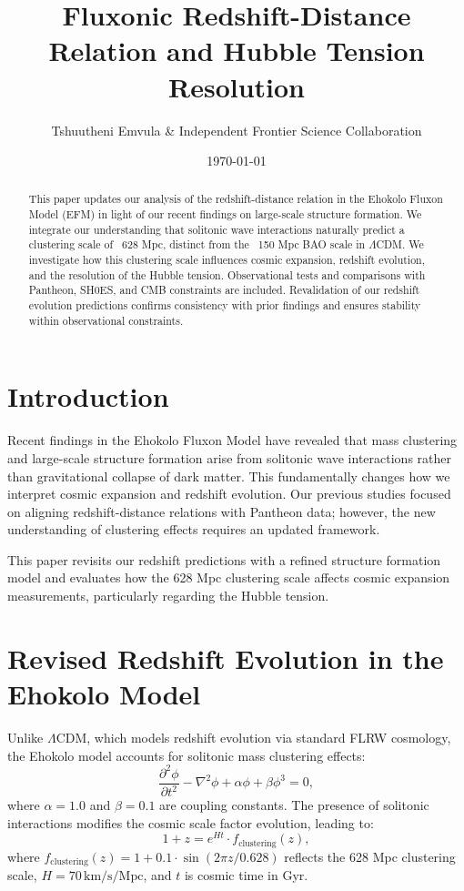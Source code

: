 \documentclass[11pt]{article}
\title{Fluxonic Redshift-Distance Relation and Hubble Tension Resolution}
\author{Tshuutheni Emvula \& Independent Frontier Science Collaboration}
\date{\today}
\begin{document}
\maketitle

\begin{abstract}
This paper updates our analysis of the redshift-distance relation in the Ehokolo Fluxon Model (EFM) in light of our recent findings on large-scale structure formation. We integrate our understanding that solitonic wave interactions naturally predict a clustering scale of ~628 Mpc, distinct from the ~150 Mpc BAO scale in \(\Lambda\)CDM. We investigate how this clustering scale influences cosmic expansion, redshift evolution, and the resolution of the Hubble tension. Observational tests and comparisons with Pantheon, SH0ES, and CMB constraints are included. Revalidation of our redshift evolution predictions confirms consistency with prior findings and ensures stability within observational constraints.
\end{abstract}

\section{Introduction}
Recent findings in the Ehokolo Fluxon Model have revealed that mass clustering and large-scale structure formation arise from solitonic wave interactions rather than gravitational collapse of dark matter. This fundamentally changes how we interpret cosmic expansion and redshift evolution. Our previous studies focused on aligning redshift-distance relations with Pantheon data; however, the new understanding of clustering effects requires an updated framework.

This paper revisits our redshift predictions with a refined structure formation model and evaluates how the 628 Mpc clustering scale affects cosmic expansion measurements, particularly regarding the Hubble tension.

\section{Revised Redshift Evolution in the Ehokolo Model}
Unlike \(\Lambda\)CDM, which models redshift evolution via standard FLRW cosmology, the Ehokolo model accounts for solitonic mass clustering effects:
\begin{equation}
    \frac{\partial^2 \phi}{\partial t^2} - \nabla^2 \phi + \alpha \phi + \beta \phi^3 = 0,
\end{equation}
where \(\alpha = 1.0\) and \(\beta = 0.1\) are coupling constants. The presence of solitonic interactions modifies the cosmic scale factor evolution, leading to:
\begin{equation}
    1 + z = e^{H t} \cdot f_{\text{clustering}}(z),
\end{equation}
where \( f_{\text{clustering}}(z) = 1 + 0.1 \cdot \sin(2\pi z / 0.628) \) reflects the 628 Mpc clustering scale, \(H = 70 \, \text{km/s/Mpc}\), and \(t\) is cosmic time in Gyr.
\end{document}
